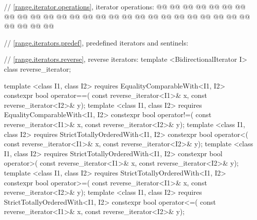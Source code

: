 {\begin{codeblock}
{{    // \ref{range.iterator.operations}, iterator operations:
    @@
      @@
      @@
      @@
      @@
    @\oldtxt{\}}@
    @@
      @@
    @@
      @@
    @@
      @@
    @@
      @@
    @@
      @@
    @@
      @@
    @@
      @@
    @@
      @@
    @@
      @@
    @@
      @@
    @@
      @@
    @@
      @@


    // \ref{range.iterators.predef}, predefined iterators and sentinels:

    // \ref{range.iterators.reverse}, reverse iterators:
    template <BidirectionalIterator I> class reverse_iterator;

    template <class I1, class I2>
        requires EqualityComparableWith<I1, I2>
      constexpr bool operator==(
        const reverse_iterator<I1>& x,
        const reverse_iterator<I2>& y);
    template <class I1, class I2>
        requires EqualityComparableWith<I1, I2>
      constexpr bool operator!=(
        const reverse_iterator<I1>& x,
        const reverse_iterator<I2>& y);
    template <class I1, class I2>
        requires StrictTotallyOrderedWith<I1, I2>
      constexpr bool operator<(
        const reverse_iterator<I1>& x,
        const reverse_iterator<I2>& y);
    template <class I1, class I2>
        requires StrictTotallyOrderedWith<I1, I2>
      constexpr bool operator>(
        const reverse_iterator<I1>& x,
        const reverse_iterator<I2>& y);
    template <class I1, class I2>
        requires StrictTotallyOrderedWith<I1, I2>
      constexpr bool operator>=(
        const reverse_iterator<I1>& x,
        const reverse_iterator<I2>& y);
    template <class I1, class I2>
        requires StrictTotallyOrderedWith<I1, I2>
      constexpr bool operator<=(
        const reverse_iterator<I1>& x,
        const reverse_iterator<I2>& y);

}}
\end{codeblock}}
